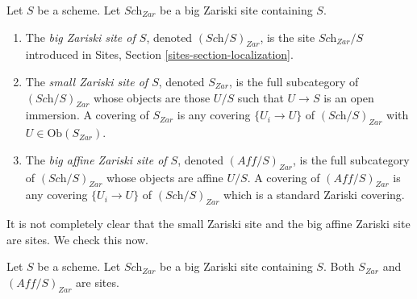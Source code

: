 \begin{definition}
\label{definition-big-small-Zariski}
Let $S$ be a scheme. Let $\textit{Sch}_{Zar}$ be a big Zariski
site containing $S$.
\begin{enumerate}
\item The {\it big Zariski site of $S$}, denoted
$(\textit{Sch}/S)_{Zar}$, is the site $\textit{Sch}_{Zar}/S$
introduced in Sites, Section \ref{sites-section-localization}.
\item The {\it small Zariski site of $S$}, denoted
$S_{Zar}$, is the full subcategory of $(\textit{Sch}/S)_{Zar}$
whose objects are those $U/S$ such that $U \to S$ is an open immersion.
A covering of $S_{Zar}$ is any covering $\{U_i \to U\}$ of
$(\textit{Sch}/S)_{Zar}$ with $U \in \text{Ob}(S_{Zar})$.
\item The {\it big affine Zariski site of $S$}, denoted
$(\textit{Aff}/S)_{Zar}$, is the full subcategory of
$(\textit{Sch}/S)_{Zar}$ whose objects are affine $U/S$.
A covering of $(\textit{Aff}/S)_{Zar}$ is any covering
$\{U_i \to U\}$ of $(\textit{Sch}/S)_{Zar}$ which is a
standard Zariski covering.
\end{enumerate}
\end{definition}

\noindent
It is not completely clear that the small Zariski site and
the big affine Zariski site are sites. We check this now.

\begin{lemma}
\label{lemma-verify-site-Zariski}
Let $S$ be a scheme. Let $\textit{Sch}_{Zar}$ be a big Zariski
site containing $S$.
Both $S_{Zar}$ and $(\textit{Aff}/S)_{Zar}$ are sites.
\end{lemma}

